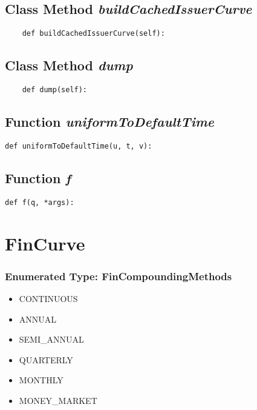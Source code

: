 \documentclass[twoside,11pt]{book}
\begin{document}
\subsection{Class Method {\it buildCachedIssuerCurve}}


\begin{lstlisting}
    def buildCachedIssuerCurve(self):
\end{lstlisting}

\subsection{Class Method {\it dump}}


\begin{lstlisting}
    def dump(self):
\end{lstlisting}

\subsection{Function {\it uniformToDefaultTime}}


\begin{lstlisting}
def uniformToDefaultTime(u, t, v):
\end{lstlisting}

\subsection{Function {\it f}}


\begin{lstlisting}
def f(q, *args):
\end{lstlisting}

\newpage
\section{FinCurve}

\subsubsection{Enumerated Type: FinCompoundingMethods}
\begin{itemize}
\item{CONTINUOUS}
\item{ANNUAL}
\item{SEMI\_ANNUAL}
\item{QUARTERLY}
\item{MONTHLY}
\item{MONEY\_MARKET}
\end{itemize}
\end{document}
